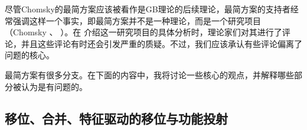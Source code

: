 尽管Chomsky的最简方案应该被看作是GB理论的后续理论，最简方案的支持者经常强调这样一个事实，即最简方案并不是一种理论，而是一个研究项目（Chomsky \citeyear[]{Chomsky2007a}、
\citeyear[]{Chomsky2013a}）。在 \citet{Chomsky95a-u}介绍这一研究项目的具体分析时，理论家们对其进行了评论，并且这些评论有时还会引发严重的质疑\citep*{Kolb97a,JL97a-u-platte,JL99a-u-gekauft,LLJ2000b,LLJ2000a,LLJ2001a,Seuren2004a,PJ2005a}。不过，我们应该承认有些评论偏离了问题的核心。

最简方案有很多分支。在下面的内容中，我将讨论一些核心的观点，并解释哪些部分被认为是有问题的。

\subsection{移位、合并、特征驱动的移位与功能投射}
\label{Abschnitt-merkmalsgetriebene-Bewegung}
\label{Abschnitt-MP-funktionale-Projektionen}\label{sec-functional-projections-minimalism}
\label{Abschnitt-Kaynesche-Modelle}

